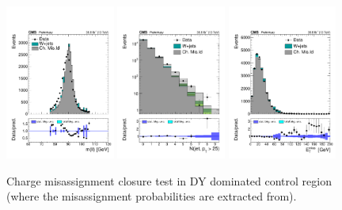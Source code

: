 \begin{figure}[htp]
	\centering
	\includegraphics[width=0.32\textwidth]{plots_leptons/chargeflip/closure_dy/minMllAFAS.pdf}
	\includegraphics[width=0.32\textwidth]{plots_leptons/chargeflip/closure_dy/nJet25.pdf}
	\includegraphics[width=0.32\textwidth]{plots_leptons/chargeflip/closure_dy/met.pdf}
	\caption{
	Charge misassignment closure test in DY dominated control region (where the misassignment probabilities are extracted from).
	}
	\label{fig:chmisid_closure_dy}
\end{figure}

